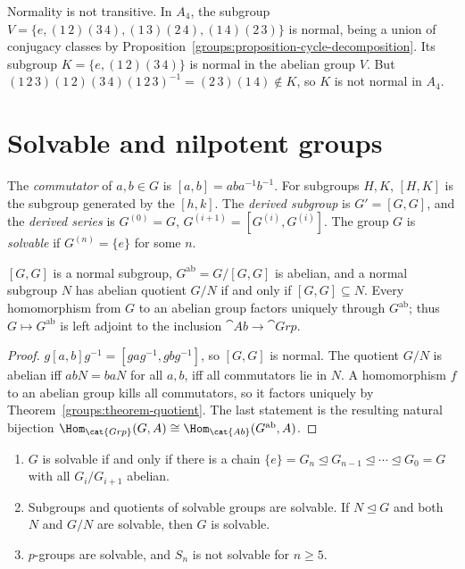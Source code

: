 \begin{counterexample}\label{groups:counterexample-normal-not-transitive}
Normality is not transitive. In $A_4$, the subgroup
$V = \{e, (1\,2)(3\,4), (1\,3)(2\,4), (1\,4)(2\,3)\}$ is normal, being a union of
conjugacy classes by Proposition~\ref{groups:proposition-cycle-decomposition}. Its
subgroup $K = \{e, (1\,2)(3\,4)\}$ is normal in the abelian group $V$. But
$(1\,2\,3)(1\,2)(3\,4)(1\,2\,3)^{-1} = (2\,3)(1\,4) \notin K$, so $K$ is not normal in $A_4$.
\end{counterexample}

\section{Solvable and nilpotent groups}\label{groups:section-solvable}

\begin{definition}\label{groups:definition-commutator}
The \emph{commutator} of $a, b \in G$ is $[a, b] = aba^{-1}b^{-1}$. For subgroups
$H, K$, $[H, K]$ is the subgroup generated by the $[h, k]$. The \emph{derived
subgroup} is $G' = [G, G]$, and the \emph{derived series} is $G^{(0)} = G$,
$G^{(i+1)} = [G^{(i)}, G^{(i)}]$. The group $G$ is \emph{solvable} if
$G^{(n)} = \{e\}$ for some $n$.
\end{definition}

\begin{proposition}\label{groups:proposition-abelianization}
$[G, G]$ is a normal subgroup, $G^{\mathrm{ab}} = G/[G, G]$ is abelian, and a normal
subgroup $N$ has abelian quotient $G/N$ if and only if $[G, G] \subseteq N$. Every
homomorphism from $G$ to an abelian group factors uniquely through $G^{\mathrm{ab}}$;
thus $G \mapsto G^{\mathrm{ab}}$ is left adjoint to the inclusion $\cat{Ab} \to \cat{Grp}$.
\end{proposition}

\begin{proof}
$g[a, b]g^{-1} = [gag^{-1}, gbg^{-1}]$, so $[G, G]$ is normal. The quotient $G/N$ is
abelian iff $abN = baN$ for all $a, b$, iff all commutators lie in $N$. A
homomorphism $f$ to an abelian group kills all commutators, so it factors
uniquely by Theorem~\ref{groups:theorem-quotient}. The last statement is the
resulting natural bijection $\Hom_{\cat{Grp}}(G, A) \cong \Hom_{\cat{Ab}}(G^{\mathrm{ab}}, A)$.
\end{proof}

\begin{proposition}\label{groups:proposition-solvable}
\begin{enumerate}
\item $G$ is solvable if and only if there is a chain
$\{e\} = G_n \trianglelefteq G_{n-1} \trianglelefteq \cdots \trianglelefteq G_0 = G$ with all $G_{i}/G_{i+1}$ abelian.
\item Subgroups and quotients of solvable groups are solvable. If
$N \trianglelefteq G$ and both $N$ and $G/N$ are solvable, then $G$ is solvable.
\item $p$-groups are solvable, and $S_n$ is not solvable for $n \geq 5$.
\end{enumerate}
\end{proposition}

